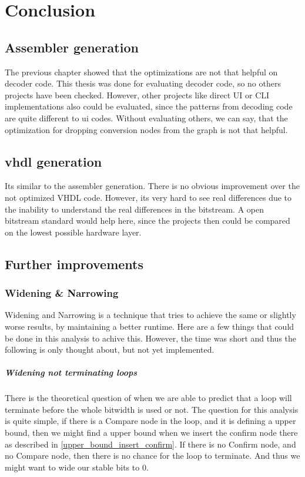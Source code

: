 \chapter{Conclusion}\label{sec:conclusion}

\section{Assembler generation}
The previous chapter showed that the optimizations are not that helpful on decoder code. This thesis was done for evaluating decoder code, so no others projects have been checked. However, other projects like direct UI or CLI implementations also could be evaluated, since the patterns from decoding code are quite different to ui codes. Without evaluating others, we can say, that the optimization for dropping conversion nodes from the graph is not that helpful.

\section{vhdl generation}
Its similar to the assembler generation. There is no obvious improvement over the not optimized VHDL code. However, its very hard to see real differences due to the inability to understand the real differences in the bitstream. A open bitstream standard would help here, since the projects then could be compared on the lowest possible hardware layer.
\section{Further improvements}
\subsection{Widening \& Narrowing}

Widening and Narrowing is a technique that tries to achieve the same or slightly worse results, by maintaining a better runtime. Here are a few things that could be done in this analysis to achive this. However, the time was short and thus the following is only thought about, but not yet implemented.

\paragraph{Widening not terminating loops}
There is the theoretical question of when we are able to predict that a loop will terminate before the whole bitwidth is used or not. The question for this analysis is quite simple, if there is a Compare node in the loop, and it is defining a upper bound, then we might find a upper bound when we insert the confirm node there as described in \ref{upper_bound_insert_confirm}. If there is no Confirm node, and no Compare node, then there is no chance for the loop to terminate. And thus we might want to wide our stable bits to 0.

